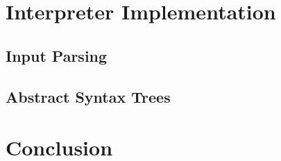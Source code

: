 \documentclass[a4paper]{article}
\begin{document}






\section{Interpreter Implementation}

\subsection{Input Parsing}

\subsection{Abstract Syntax Trees}

\section{Conclusion}



\end{document}
